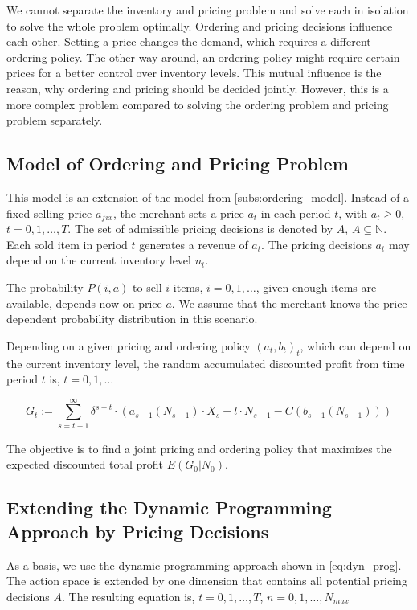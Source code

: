 We cannot separate the inventory and pricing problem and solve each in isolation to solve the whole problem optimally.
Ordering and pricing decisions influence each other.
Setting a price changes the demand, which requires a different ordering policy.
The other way around, an ordering policy might require certain prices for a better control over inventory levels.
This mutual influence is the reason, why ordering and pricing should be decided jointly.
However, this is a more complex problem compared to solving the ordering problem and pricing problem separately.

\subsection{Model of Ordering and Pricing Problem}
\label{subs:joint_model}
This model is an extension of the model from \cref{subs:ordering_model}.
Instead of a fixed selling price $a_{fix}$, the merchant sets a price $a_t$ in each period $t$, with $a_t \geq 0$, $t=0,1,\ldots,T$.
The set of admissible pricing decisions is denoted by $A$, $A \subseteq  \mathbb{N}$.
Each sold item in period $t$ generates a revenue of $a_t$.
The pricing decisions $a_t$ may depend on the current inventory level $n_t$.

The probability $P(i, a)$ to sell $i$ items, $i=0,1,\ldots$, given enough items are available, depends now on price $a$.
We assume that the merchant knows the price-dependent probability distribution in this scenario.

Depending on a given pricing and ordering policy $(a_t, b_t)_t$, which can depend on the current inventory level, the random accumulated discounted profit from time period $t$ is, $t=0,1,\ldots$

$$
G_t := \sum_{s=t+1}^{\infty} \delta^{s-t} \cdot (a_{s-1}(N_{s-1}) \cdot X_s - l \cdot N_{s-1} - C(b_{s-1}(N_{s-1})))
$$

The objective is to find a joint pricing and ordering policy that maximizes the expected discounted total profit $E(G_0 | N_0)$.

\subsection{Extending the Dynamic Programming Approach by Pricing Decisions}
\label{section:joint_solution}
As a basis, we use the dynamic programming approach shown in \cref{eq:dyn_prog}.
The action space is extended by one dimension that contains all potential pricing decisions $A$.
The resulting equation is, $t=0, 1, \ldots,T$, $n = 0,1,\ldots,N_{max}$

